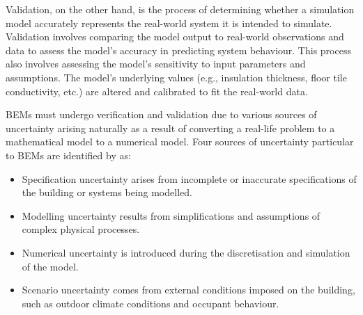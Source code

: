 Validation, on the other hand, is the process of determining whether a simulation model accurately represents the real-world system it is intended to simulate. Validation involves comparing the model output to real-world observations and data to assess the model's accuracy in predicting system behaviour. This process also involves assessing the model's sensitivity to input parameters and assumptions. The model's underlying values (e.g., insulation thickness, floor tile conductivity, etc.) are altered and calibrated to fit the real-world data.

\acp{BEM} must undergo verification and validation due to various sources of uncertainty arising naturally as a result of converting a real-life problem to a mathematical model to a numerical model. Four sources of uncertainty particular to \acp{BEM} are identified by \cite{coakley_review_2014,DEWIT2002951} as: 
\begin{itemize}
    \item Specification uncertainty arises from incomplete or inaccurate specifications of the building or systems being modelled. 
    \item Modelling uncertainty results from simplifications and assumptions of complex physical processes. 
    \item Numerical uncertainty is introduced during the discretisation and simulation of the model. 
    \item Scenario uncertainty comes from external conditions imposed on the building, such as outdoor climate conditions and occupant behaviour.
\end{itemize}


